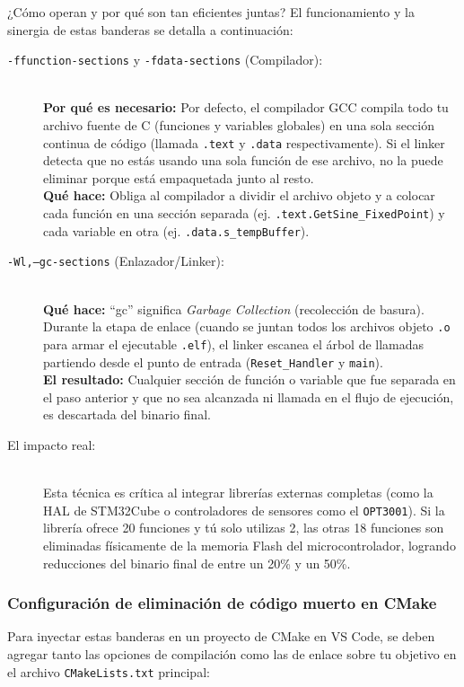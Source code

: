 \documentclass[
10pt, %
a4paper, %
oneside, %
headinclude,footinclude, %
BCOR5mm, %
]{scrartcl}
\begin{document}
\begin{InfoBox}{¿Cómo operan y por qué son tan eficientes juntas?}
	El funcionamiento y la sinergia de estas banderas se detalla a continuación:
	\begin{description}
		\item[\texttt{-ffunction-sections} y \texttt{-fdata-sections} (Compilador):]~\\
		\textbf{Por qué es necesario:} Por defecto, el compilador GCC compila todo tu archivo fuente de C (funciones y variables globales) en una sola sección continua de código (llamada \texttt{.text} y \texttt{.data} respectivamente). Si el linker detecta que no estás usando una sola función de ese archivo, no la puede eliminar porque está empaquetada junto al resto. \\
		\textbf{Qué hace:} Obliga al compilador a dividir el archivo objeto y a colocar cada función en una sección separada (ej. \texttt{.text.GetSine\_FixedPoint}) y cada variable en otra (ej. \texttt{.data.s\_tempBuffer}).
		
		\item[\texttt{-Wl,--gc-sections} (Enlazador/Linker):]~\\
		\textbf{Qué hace:} ``gc'' significa \textit{Garbage Collection} (recolección de basura). Durante la etapa de enlace (cuando se juntan todos los archivos objeto \texttt{.o} para armar el ejecutable \texttt{.elf}), el linker escanea el árbol de llamadas partiendo desde el punto de entrada (\texttt{Reset\_Handler} y \texttt{main}). \\
		\textbf{El resultado:} Cualquier sección de función o variable que fue separada en el paso anterior y que no sea alcanzada ni llamada en el flujo de ejecución, es descartada del binario final.
		
		\item[El impacto real:]~\\
		Esta técnica es crítica al integrar librerías externas completas (como la HAL de STM32Cube o controladores de sensores como el \texttt{OPT3001}). Si la librería ofrece 20 funciones y tú solo utilizas 2, las otras 18 funciones son eliminadas físicamente de la memoria Flash del microcontrolador, logrando reducciones del binario final de entre un 20\% y un 50\%.
	\end{description}
\end{InfoBox}

\subsubsection{Configuración de eliminación de código muerto en CMake}
Para inyectar estas banderas en un proyecto de CMake en VS Code, se deben agregar tanto las opciones de compilación como las de enlace sobre tu objetivo en el archivo \texttt{CMakeLists.txt} principal:
\end{document}
